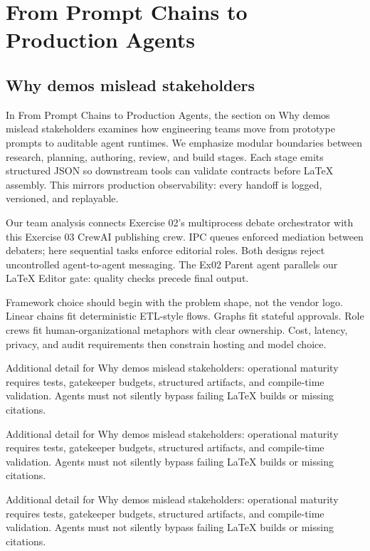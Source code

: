 \section{From Prompt Chains to Production Agents}

\subsection{Why demos mislead stakeholders}
In From Prompt Chains to Production Agents, the section on Why demos mislead stakeholders examines how engineering teams move from prototype prompts to auditable agent runtimes. We emphasize modular boundaries between research, planning, authoring, review, and build stages. Each stage emits structured JSON so downstream tools can validate contracts before LaTeX assembly. This mirrors production observability: every handoff is logged, versioned, and replayable. \cite{crewai2024} \cite{langgraph2024} \cite{mcp2024}

Our team analysis connects Exercise 02's multiprocess debate orchestrator with this Exercise 03 CrewAI publishing crew. IPC queues enforced mediation between debaters; here sequential tasks enforce editorial roles. Both designs reject uncontrolled agent-to-agent messaging. The Ex02 Parent agent parallels our LaTeX Editor gate: quality checks precede final output. \cite{crewai2024} \cite{langgraph2024} \cite{mcp2024}

Framework choice should begin with the problem shape, not the vendor logo. Linear chains fit deterministic ETL-style flows. Graphs fit stateful approvals. Role crews fit human-organizational metaphors with clear ownership. Cost, latency, privacy, and audit requirements then constrain hosting and model choice. \cite{crewai2024} \cite{langgraph2024} \cite{mcp2024}

Additional detail for Why demos mislead stakeholders: operational maturity requires tests, gatekeeper budgets, structured artifacts, and compile-time validation. Agents must not silently bypass failing LaTeX builds or missing citations. \cite{crewai2024} \cite{langgraph2024} \cite{mcp2024}

Additional detail for Why demos mislead stakeholders: operational maturity requires tests, gatekeeper budgets, structured artifacts, and compile-time validation. Agents must not silently bypass failing LaTeX builds or missing citations. \cite{crewai2024} \cite{langgraph2024} \cite{mcp2024}

Additional detail for Why demos mislead stakeholders: operational maturity requires tests, gatekeeper budgets, structured artifacts, and compile-time validation. Agents must not silently bypass failing LaTeX builds or missing citations. \cite{crewai2024} \cite{langgraph2024} \cite{mcp2024}

